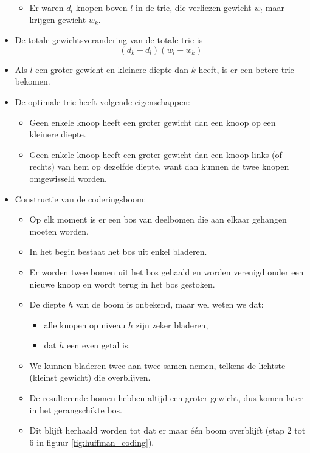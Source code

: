 \begin{itemize}
\begin{itemize}
        \item Er waren $d_l$ knopen boven $l$ in de trie, die verliezen gewicht $w_l$ maar krijgen gewicht $w_k$.
    \end{itemize}
    \item De totale gewichtsverandering van de totale trie is 
    $$(d_k - d_l)(w_l - w_k)$$
    \item Als $l$ een groter gewicht en kleinere diepte dan $k$ heeft, is er een betere trie bekomen.
    \item De optimale trie heeft volgende eigenschappen:
    \begin{itemize}
        \item Geen enkele knoop heeft een groter gewicht dan een knoop op een kleinere diepte.
        \item Geen enkele knoop heeft een groter gewicht dan een knoop links (of rechts) van hem op dezelfde diepte, want dan kunnen de twee knopen omgewisseld worden.
    \end{itemize}
    \item Constructie van de coderingsboom: 
    \begin{itemize}
        \item Op elk moment is er een bos van deelbomen die aan elkaar gehangen moeten worden.
        \item In het begin bestaat het bos uit enkel bladeren.
        \item Er worden twee bomen uit het bos gehaald en worden verenigd onder een nieuwe knoop en wordt terug in het bos gestoken.
        \item De diepte $h$ van de boom is onbekend, maar wel weten we dat:
        \begin{itemize}
            \item alle knopen op niveau $h$ zijn zeker bladeren,
            \item dat $h$ een even getal is.
        \end{itemize}
        \item We kunnen bladeren twee aan twee samen nemen, telkens de lichtste (kleinst gewicht)  die overblijven.
        \item De resulterende bomen hebben altijd een groter gewicht, dus komen later in het gerangschikte bos.
        \item Dit blijft herhaald worden tot dat er maar één boom overblijft (stap 2 tot 6 in figuur \ref{fig:huffman_coding}).
    \end{itemize}
\end{itemize}

